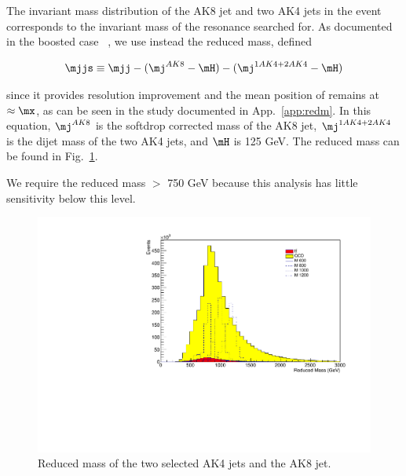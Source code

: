 The invariant \mjj mass distribution of the AK8 jet and two AK4 jets in the event corresponds to the invariant mass of the resonance searched for. As documented in the boosted case ~\cite{CMS-PAS-B2G-16-026}, we use instead the reduced mass, defined
\begin{linenomath}
\begin{equation}
\mjjs \equiv \mjj - (\mj^{AK8}-\mH) - (\mj^{1AK4 + 2AK4}-\mH)
\label{eq:Mjjs}
\end{equation}
\end{linenomath}
since it provides resolution improvement and the mean position of \mjjs remains at $\approx \mx$, as can be seen in the study documented in App.~\ref{app:redm}. In this equation, $\mj^{AK8}$ is the softdrop corrected mass of the AK8 jet, $\mj^{1AK4 + 2AK4}$ is the dijet mass of the two AK4 jets, and $\mH$ is 125 GeV. The reduced mass can be found in Fig.~\ref{fig:redm}.

We require the reduced mass $>$ 750 GeV because this analysis has little sensitivity below this level.

\begin{figure}[h]
\begin{center}
\includegraphics[scale=0.5]{F5/shaperedmass.pdf}
\end{center}
\caption{Reduced mass of the two selected AK4 jets and the AK8 jet.}
\label{fig:redm}
\end{figure} 

